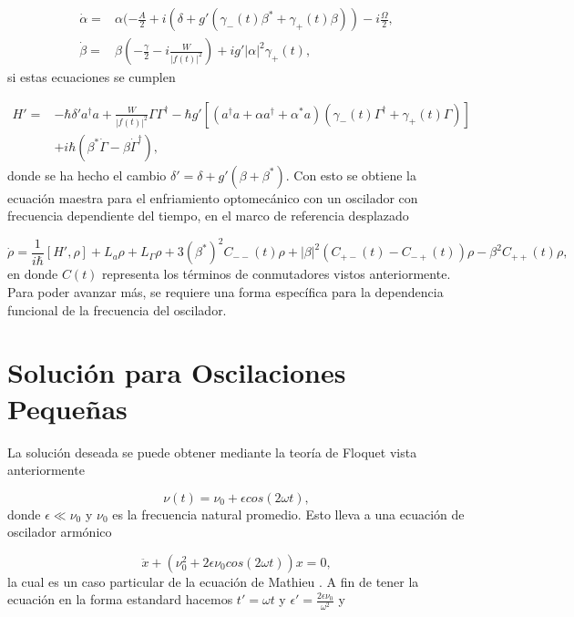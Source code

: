 \documentclass[10pt,a4paper]{report}
\begin{document}
\begin{align}
\dot{\alpha} =& \alpha(-\frac{A}{2}+i(\delta+g'(\gamma_-(t) \beta^* + \gamma_+(t) \beta))-i\frac{\Omega}{2},\\
\dot{\beta} =& \beta(-\frac{\gamma}{2}-i\frac{W}{|f(t)|^2})+ig'|\alpha|^2\gamma_+(t),
\end{align} si estas ecuaciones se cumplen


\begin{align*}
H'=& -\hbar \delta' a^\dagger a + \frac{W}{|f(t)|^2}\Gamma \Gamma^\dagger -\hbar g'[(a^{\dagger}a +\alpha a^{\dagger}+\alpha^* a)(\gamma_-(t)\Gamma^{\dagger}+\gamma_+(t)\Gamma)]\\
&+ i\hbar(\beta^*\dot{\Gamma} - \beta \dot{\Gamma}^\dagger),
\end{align*}  donde se ha hecho el cambio $\delta' = \delta + g'(\beta + \beta^*)$. Con esto se obtiene la ecuación maestra para el enfriamiento optomecánico con un oscilador con frecuencia dependiente del tiempo, en el marco de referencia desplazado

\begin{equation}\label{DLCMasterEquation}
\dot{\rho} = \frac{1}{i\hbar}[H',\rho] + L_a\rho + L_\Gamma\rho + 3(\beta^*)^2C_{--}(t)\rho + |\beta|^2(C_{+-}(t) - C_{-+}(t))\rho -  \beta^2 C_{++}(t)\rho,
\end{equation} en donde $C(t)$ representa los términos de conmutadores vistos anteriormente. Para poder avanzar más, se requiere una forma específica para la dependencia funcional de la frecuencia del oscilador. 

\section{Solución para Oscilaciones Pequeñas}

La solución deseada se puede obtener mediante la teoría de Floquet vista anteriormente

\begin{equation}\label{SmallOscillationsTDHO}
\nu(t) = \nu_0 + \epsilon cos(2\omega t),
\end{equation} donde $\epsilon \ll \nu_0$ y $\nu_0$ es la frecuencia natural promedio. Esto lleva a una ecuación de oscilador armónico

\begin{equation}
\ddot{x} + (\nu_0^2 + 2\epsilon \nu_0 cos(2\omega t))x = 0,
\end{equation} la cual es un caso particular de la ecuación de Mathieu \cite{PiatekME}. A fin de tener la ecuación en la forma estandard hacemos $t'= \omega t$ y $\epsilon' = \frac{2\epsilon \nu_0}{\omega^2}$ y
\end{document}
